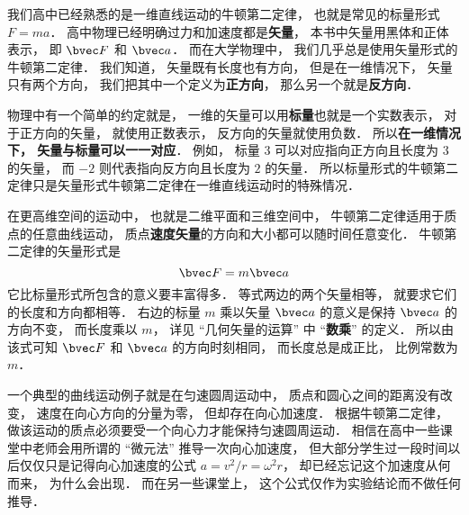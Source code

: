 
\begin{issues}
\issueDraft
\end{issues}


我们高中已经熟悉的是一维直线运动的牛顿第二定律， 也就是常见的标量形式 $F = ma$． 高中物理已经明确过力和加速度都是\textbf{矢量}， 本书中矢量用黑体和正体表示， 即 $\bvec F$ 和 $\bvec a$． 而在大学物理中， 我们几乎总是使用矢量形式的牛顿第二定律． 我们知道， 矢量既有长度也有方向， 但是在一维情况下， 矢量只有两个方向， 我们把其中一个定义为\textbf{正方向}， 那么另一个就是\textbf{反方向}． 

物理中有一个简单的约定就是， 一维的矢量可以用\textbf{标量}也就是一个实数表示， 对于正方向的矢量， 就使用正数表示， 反方向的矢量就使用负数． 所以\textbf{在一维情况下， 矢量与标量可以一一对应}． 例如， 标量 $3$ 可以对应指向正方向且长度为 $3$ 的矢量， 而 $-2$ 则代表指向反方向且长度为 $2$ 的矢量． 所以标量形式的牛顿第二定律只是矢量形式牛顿第二定律在一维直线运动时的特殊情况．

在更高维空间的运动中， 也就是二维平面和三维空间中， 牛顿第二定律适用于质点的任意曲线运动， 质点\textbf{速度矢量}的方向和大小都可以随时间任意变化． 牛顿第二定律的矢量形式是
\begin{equation}
\bvec F = m\bvec a
\end{equation}
它比标量形式所包含的意义要丰富得多． 等式两边的两个矢量相等， 就要求它们的长度和方向都相等． 右边的标量 $m$ 乘以矢量 $\bvec a$ 的意义是保持 $\bvec a$ 的方向不变， 而长度乘以 $m$， 详见 “几何矢量的运算” 中 “\textbf{数乘}” 的定义． 所以由该式可知 $\bvec F$ 和 $\bvec a$ 的方向时刻相同， 而长度总是成正比， 比例常数为 $m$．

一个典型的曲线运动例子就是在匀速圆周运动中， 质点和圆心之间的距离没有改变， 速度在向心方向的分量为零， 但却存在向心加速度． 根据牛顿第二定律， 做该运动的质点必须要受一个向心力才能保持匀速圆周运动． 相信在高中一些课堂中老师会用所谓的 “微元法” 推导一次向心加速度， 但大部分学生过一段时间以后仅仅只是记得向心加速度的公式 $a = v^2/r = \omega^2 r$， 却已经忘记这个加速度从何而来， 为什么会出现． 而在另一些课堂上， 这个公式仅作为实验结论而不做任何推导．

